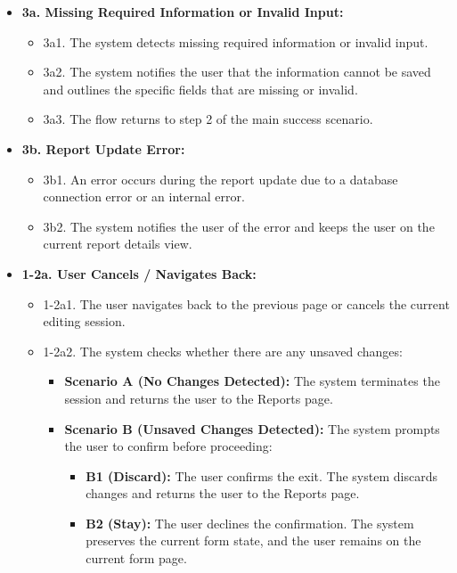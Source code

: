 \begin{itemize} [label={}, leftmargin=0.75cm, noitemsep]

    \item \textbf{3a. Missing Required Information or Invalid Input:}
    \begin{itemize} [label={}, leftmargin=0.75cm, noitemsep]
        \item 3a1. The system detects missing required information or invalid input.
        \item 3a2. The system notifies the user that the information cannot be saved and outlines the specific fields that are missing or invalid.
        \item 3a3. The flow returns to step 2 of the main success scenario.
    \end{itemize}

    \item \textbf{3b. Report Update Error:}
    \begin{itemize} [label={}, leftmargin=0.75cm, noitemsep]
        \item 3b1. An error occurs during the report update due to a database connection error or an internal error.
        \item 3b2. The system notifies the user of the error and keeps the user on the current report details view.
    \end{itemize}

    \item \textbf{1-2a. User Cancels / Navigates Back:}
    \begin{itemize} [label={}, leftmargin=0.75cm, noitemsep]
        \item 1-2a1. The user navigates back to the previous page or cancels the current editing session.
        \item 1-2a2. The system checks whether there are any unsaved changes:
        \begin{itemize} [label={}, leftmargin=0.75cm, noitemsep]
            \item \textbf{Scenario A (No Changes Detected):} The system terminates the session and returns the user to the Reports page.
            \item \textbf{Scenario B (Unsaved Changes Detected):} The system prompts the user to confirm before proceeding:
            \begin{itemize} [label={}, leftmargin=0.75cm, noitemsep]
                \item \textbf{B1 (Discard):} The user confirms the exit. The system discards changes and returns the user to the Reports page.
                \item \textbf{B2 (Stay):} The user declines the confirmation. The system preserves the current form state, and the user remains on the current form page.
            \end{itemize}
        \end{itemize}
    \end{itemize}

\end{itemize}

\vspace{0.3cm}

